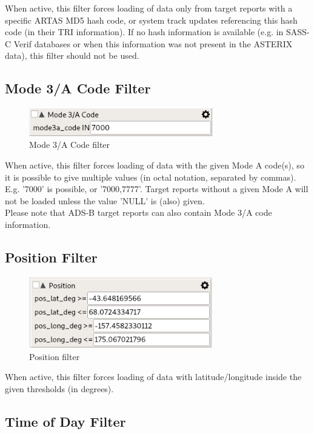 When active, this filter forces loading of data only from target reports with a specific ARTAS MD5 hash code, or system track updates referencing this hash code (in their TRI information). If no hash information is available (e.g. in SASS-C Verif databases or when this information was not present in the ASTERIX data), this filter should not be used.

\subsection{Mode 3/A Code Filter}

\begin{figure}[H]
  \center
    \includegraphics[width=8cm,frame]{figures/filter_mode3a.png}
  \caption{Mode 3/A Code filter}
\end{figure}

When active, this filter forces loading of data with the given Mode A code(s), so it is possible to give multiple values (in octal notation, separated by commas). E.g. '7000' is possible, or '7000,7777'. Target reports without a given Mode A will not be loaded unless the value 'NULL' is (also) given. \\

Please note that ADS-B target reports can also contain Mode 3/A code information.

\subsection{Position Filter}

\begin{figure}[H]
  \center
    \includegraphics[width=8cm,frame]{figures/filter_position.png}
  \caption{Position filter}
\end{figure}

When active, this filter forces loading of data with latitude/longitude inside the given thresholds (in degrees).

\subsection{Time of Day Filter}

